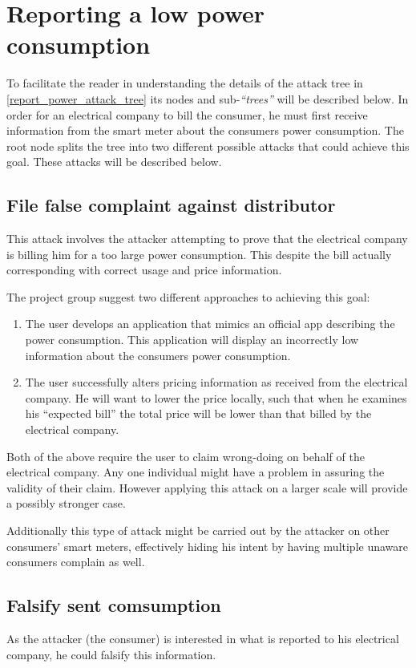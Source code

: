 
\section{Reporting a low power consumption}
To facilitate the reader in understanding the details of the attack tree in \cref{report_power_attack_tree} its nodes and sub-\emph{``trees''} will be described below.
In order for an electrical company to bill the consumer, he must first receive information from the smart meter about the consumers power consumption.
The root node splits the tree into two different possible attacks that could achieve this goal.
These attacks will be described below.

\subsection{File false complaint against distributor}
This attack involves the attacker attempting to prove that the electrical company is billing him for a too large power consumption.
This despite the bill actually corresponding with correct usage and price information.

The project group suggest two different approaches to achieving this goal:
\begin{enumerate}
  \item The user develops an application that mimics an official app describing the power consumption.
  This application will display an incorrectly low information about the consumers power consumption.
  \item The user successfully alters pricing information as received from the electrical company.
  He will want to lower the price locally, such that when he examines his ``expected bill'' the total price will be lower than that billed by the electrical company.
\end{enumerate}
Both of the above require the user to claim wrong-doing on behalf of the electrical company.
Any one individual might have a problem in assuring the validity of their claim.
However applying this attack on a larger scale will provide a possibly stronger case.

Additionally this type of attack might be carried out by the attacker on other consumers' smart meters, effectively hiding his intent by having multiple unaware consumers complain as well.

\subsection{Falsify sent comsumption}
As the attacker (the consumer) is interested in what is reported to his electrical company, he could falsify this information.

